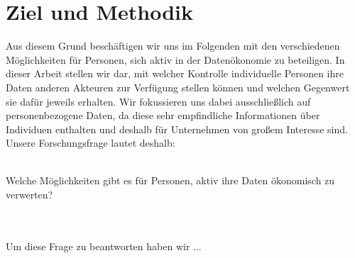 \section{Ziel und Methodik}

Aus diesem Grund beschäftigen wir uns im Folgenden mit den verschiedenen Möglichkeiten für Personen, sich aktiv in der Datenökonomie zu beteiligen. In dieser Arbeit stellen wir dar, mit welcher Kontrolle individuelle Personen ihre Daten anderen Akteuren zur Verfügung stellen können und welchen Gegenwert sie dafür jeweils erhalten. Wir fokussieren uns dabei ausschließlich auf personenbezogene Daten, da diese sehr empfindliche Informationen über Individuen enthalten und deshalb für Unternehmen von großem Interesse sind. Unsere Forschungsfrage lautet deshalb:
\\
\\
\centerline{Welche Möglichkeiten gibt es für Personen, aktiv ihre Daten ökonomisch zu verwerten?}
\\
\\
Um diese Frage zu beantworten haben wir ...